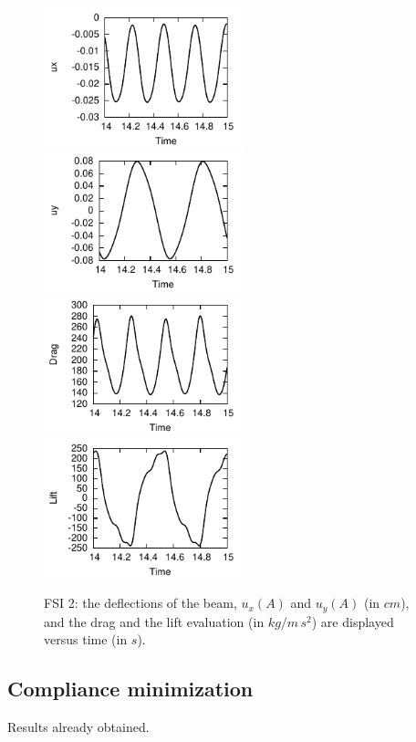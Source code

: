 \documentclass[prodmode,acmtoms]{acmsmall}
\numberwithin{equation}{section}
\begin{document}
\begin{figure}
\centering
{\includegraphics[width=5.8cm]{Pictures/ux_FSI_2_FS_t_3e-2_t_15e-3_global_2_Hron_grid.pdf}}
{\includegraphics[width=5.8cm]{Pictures/uy_FSI_2_FS_t_3e-2_t_15e-3_global_2_Hron_grid.pdf}}
{\includegraphics[width=5.8cm]{Pictures/Drag_fluid_FSI_2_FS_t_3e-2_t_15e-3_global_2_Hron_grid.pdf}}
{\includegraphics[width=5.8cm]{Pictures/Lift_fluid_FSI_2_FS_t_3e-2_t_15e-3_global_2_Hron_grid.pdf}}
\caption{FSI 2: the deflections of the beam, $u_x(A)$ and $u_y(A)$ (in $cm$), and 
the drag and the lift evaluation (in $kg/m\,s^2$) are displayed versus
time (in $s$).
} 
\label{res:results_ux_and_uy_fsi_2}
\end{figure}


\subsection{Compliance minimization}
Results already obtained.
\end{document}
